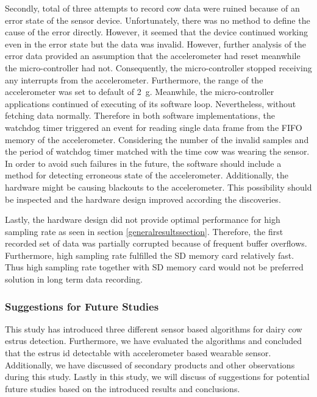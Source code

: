 \documentclass[english,12pt,a4paper,pdftex,elec,utf8]{aaltothesis}
\begin{document}
Secondly, total of three attempts to record cow data were ruined because of an error state of the sensor device. Unfortunately, there was no method to define the cause of the error directly. However, it seemed that the device continued working even in the error state but the data was invalid. However, further analysis of the error data provided an assumption that the accelerometer had reset meanwhile the micro-controller had not. Consequently, the micro-controller stopped receiving any interrupts from the accelerometer. Furthermore, the range of the accelerometer was set to default of \SI{2}{\gram}. Meanwhile, the micro-controller applications continued of executing of its software loop. Nevertheless, without fetching data normally. Therefore in both software implementations, the watchdog timer triggered an event for reading single data frame from the FIFO memory of the accelerometer. Considering the number of the invalid samples and the period of watchdog timer matched with the time cow was wearing the sensor. In order to avoid such failures in the future, the software should include a method for detecting erroneous state of the accelerometer. Additionally, the hardware might be causing blackouts to the accelerometer. This possibility should be inspected and the hardware design improved according the discoveries.

Lastly, the hardware design did not provide optimal performance for high sampling rate as seen in section \ref{generalresultssection}. Therefore, the first recorded set of data was partially corrupted because of frequent buffer overflows. Furthermore, high sampling rate fulfilled the SD memory card relatively fast. Thus high sampling rate together with SD memory card would not be preferred solution in long term data recording. 



\subsubsection{Suggestions for Future Studies}

This study has introduced three different sensor based algorithms for dairy cow estrus detection. Furthermore, we have evaluated the algorithms and concluded that the estrus id detectable with accelerometer based wearable sensor. Additionally, we have discussed of secondary products and other observations during this study. Lastly in this study, we will discuss of suggestions for potential future studies based on the introduced results and conclusions.\\
\end{document}
